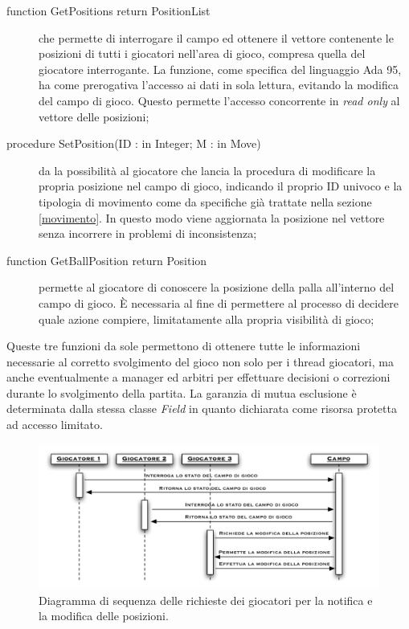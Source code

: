 \documentclass[aps,letterpaper,10pt]{article}
\begin{document}
\begin{description}
	\item[function GetPositions return PositionList] che permette di interrogare il campo ed ottenere il vettore contenente le posizioni di tutti i giocatori nell'area di gioco, compresa quella del giocatore interrogante. La funzione, come specifica del linguaggio Ada 95, ha come prerogativa l'accesso ai dati in sola lettura, evitando la modifica del campo di gioco. Questo permette l'accesso concorrente in \emph{read only} al vettore delle posizioni;
	\item[procedure SetPosition(ID : in Integer; M : in Move)] da la possibilit\`a al giocatore che lancia la procedura di modificare la propria posizione nel campo di gioco, indicando il proprio ID univoco e la tipologia di movimento come da specifiche gi\`a trattate nella sezione \ref{movimento}. In questo modo viene aggiornata la posizione nel vettore senza incorrere in problemi di inconsistenza;
	\item[function GetBallPosition return Position] permette al giocatore di conoscere la posizione della palla all'interno del campo di gioco. \`E necessaria al fine di permettere al processo di decidere quale azione compiere, limitatamente alla propria visibilit\`a di gioco;
\end{description}

Queste tre funzioni da sole permettono di ottenere tutte le informazioni necessarie al corretto svolgimento del gioco non solo per i thread giocatori, ma anche eventualmente a manager ed arbitri per effettuare decisioni o correzioni durante lo svolgimento della partita. La garanzia di mutua esclusione \`e determinata dalla stessa classe \emph{Field} in quanto dichiarata come risorsa protetta ad accesso limitato.

\begin{figure}[H]
	\begin{center}
		\includegraphics[width=440px]{images/concurrent-game-state.pdf}
	\end{center}
\caption{Diagramma di sequenza delle richieste dei giocatori per la notifica e la modifica delle posizioni.}
\end{figure}
\end{document}
